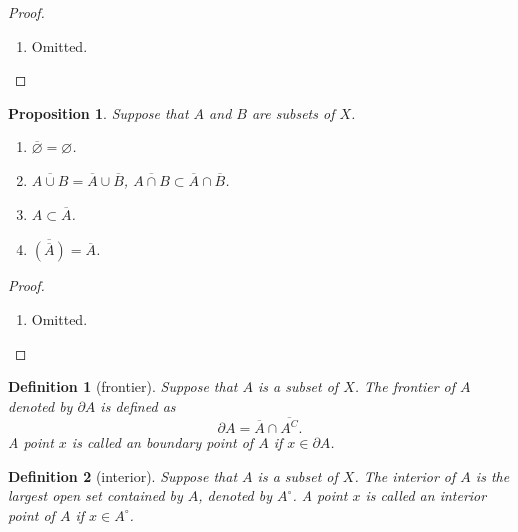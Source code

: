 \documentclass{report}
\newtheorem{definition}{Definition}[section]
\newtheorem{proposition}{Proposition}[section]
\theoremstyle{nonumberplain}
\newtheorem{proof}{Proof.}
\begin{document}
\begin{proof}~\\ \vspace{-1em}
	\begin{enumerate}	
		\item Omitted.
	\end{enumerate}
\end{proof}
\begin{proposition}
Suppose that $A$ and $B$ are subsets of $X$.
	\begin{enumerate}
		\item $\overline{\varnothing}=\varnothing$.	
		\item $\overline{A \cup B}=\overline{A}\cup\overline{B}$,  $\overline{A \cap B}\subset\overline{A}\cap\overline{B}$.
		\item $A\subset\overline{A}$.
		\item $\overline{\left(\overline{A}\right)}=\overline{A}$.
	\end{enumerate}
\end{proposition}

\begin{proof}~\\ \vspace{-1em}
	\begin{enumerate}	
		\item Omitted.
	\end{enumerate}
\end{proof}

\begin{definition}[frontier]
	Suppose that $A$ is a subset of $X$. The \emph{frontier} of $A$ denoted by $\partial A$ is defined as
	\[
	\partial A=\overline{A}\cap\overline{A^C}.
	\] A point $x$ is called an \emph{boundary point} of $A$ if $x\in \partial A$.
\end{definition}

\begin{definition}[interior]
	Suppose that $A$ is a subset of $X$. The \emph{interior} of $A$ is the largest open set contained by $A$, denoted by $A^{\circ}$. A point $x$ is called an \emph{interior point} of $A$ if $x\in A^{\circ}$.
\end{definition}
\end{document}
